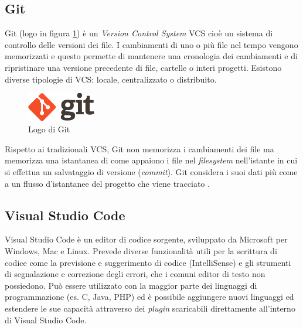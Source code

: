 \subsection{Git}
Git (logo in figura \ref{fig:gitLogo}) è un \textit{Version Control System} VCS cioè un sistema di controllo delle versioni dei file. I cambiamenti di uno o più file nel tempo vengono memorizzati e questo permette di mantenere una cronologia dei cambiamenti e di ripristinare una versione precedente di file, cartelle o interi progetti.
Esistono diverse tipologie di VCS: locale, centralizzato o distribuito.
\begin{figure}
    \centering
    \includegraphics[width=3cm]{img/gitlogo.png}
    \caption{Logo di Git}
    \label{fig:gitLogo}
\end{figure}
Rispetto ai tradizionali VCS, Git non memorizza i cambiamenti dei file ma memorizza una istantanea di come appaiono i file nel \textit{filesystem} nell'istante in cui si effettua un salvataggio di versione (\textit{commit}). Git considera i suoi dati più come a un flusso d'istantanee del progetto che viene tracciato \cite{gitSite}.

%
\subsection{Visual Studio Code}
Visual Studio Code è un editor di codice sorgente, sviluppato da Microsoft per Windows, Mac e Linux. Prevede diverse funzionalità utili per la scrittura di codice come la previsione e suggerimento di codice (IntelliSense) e gli strumenti di segnalazione e correzione degli errori, che i comuni editor di testo non possiedono.
Può essere utilizzato con la maggior parte dei linguaggi di programmazione (es. C, Java, PHP) ed è possibile aggiungere nuovi linguaggi ed estendere le sue capacità attraverso dei \textit{plugin} scaricabili direttamente all'interno di Visual Studio Code.

